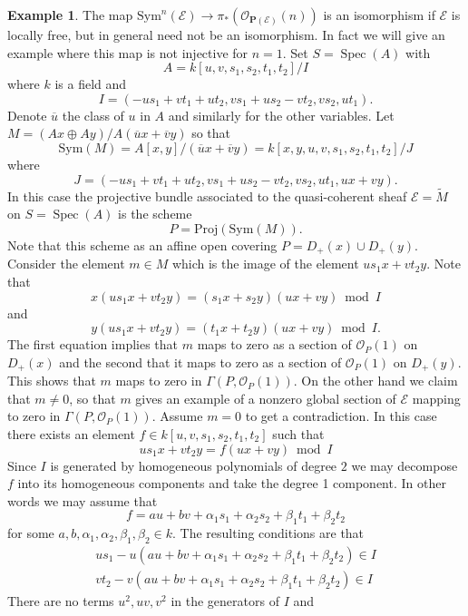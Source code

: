 \documentclass{stacks-project}
\theoremstyle{plain}
\theoremstyle{definition}
\newtheorem{example}[subsection]{Example}
\theoremstyle{remark}
\numberwithin{equation}{subsection}
\def\Spec{\mathop{\mathrm{Spec}}}
\begin{document}
\begin{example}
\label{example-projective-bundle}
The map $\text{Sym}^n(\mathcal{E}) \to
\pi_*(\mathcal{O}_{\mathbf{P}(\mathcal{E})}(n))$
is an isomorphism if $\mathcal{E}$ is locally free, but in general
need not be an isomorphism. In fact we will give an example where
this map is not injective for $n = 1$. Set $S = \Spec(A)$ with
$$
A = k[u, v, s_1, s_2, t_1, t_2]/I
$$
where $k$ is a field and
$$
I = (-us_1 + vt_1 + ut_2, vs_1 + us_2 - vt_2, vs_2, ut_1).
$$
Denote $\overline{u}$ the class of $u$ in $A$ and similarly for
the other variables.
Let $M = (Ax \oplus Ay)/A(\overline{u}x + \overline{v}y)$ so that
$$
\text{Sym}(M) = A[x, y]/(\overline{u}x + \overline{v}y)
= k[x, y, u, v, s_1, s_2, t_1, t_2]/J
$$
where
$$
J = (-us_1 + vt_1 + ut_2, vs_1 + us_2 - vt_2, vs_2, ut_1, ux + vy).
$$
In this case the projective bundle associated to the quasi-coherent
sheaf $\mathcal{E} = \widetilde{M}$ on $S = \Spec(A)$ is the scheme
$$
P =
\text{Proj}(\text{Sym}(M)).
$$
Note that this scheme as an affine open covering
$P = D_{+}(x) \cup D_{+}(y)$.
Consider the element
$m \in M$ which is the image of the element
$us_1x + vt_2y$. Note that
$$
x(us_1x + vt_2y) = (s_1x + s_2y)(ux + vy) \bmod I
$$
and
$$
y(us_1x + vt_2y) = (t_1x + t_2y)(ux + vy) \bmod I.
$$
The first equation implies that $m$ maps to zero as a
section of $\mathcal{O}_P(1)$ on $D_{+}(x)$ and the second
that it maps to zero as a section of $\mathcal{O}_P(1)$ on $D_{+}(y)$.
This shows that $m$ maps to zero in $\Gamma(P, \mathcal{O}_P(1))$.
On the other hand we claim that $m \not = 0$, so that $m$ gives
an example of a nonzero global section of $\mathcal{E}$ mapping to zero
in $\Gamma(P, \mathcal{O}_P(1))$. Assume $m = 0$
to get a contradiction. In this case there exists
an element $f \in k[u, v, s_1, s_2, t_1, t_2]$ such that
$$
us_1x + vt_2y = f(ux + vy) \bmod I
$$
Since $I$ is generated by homogeneous polynomials of degree $2$ we
may decompose $f$ into its homogeneous components and take the
degree 1 component. In other words we may assume that
$$
f = au + bv + \alpha_1s_1 + \alpha_2s_2 + \beta_1t_1 + \beta_2t_2
$$
for some $a, b, \alpha_1, \alpha_2, \beta_1, \beta_2 \in k$.
The resulting conditions are that
$$
\begin{matrix}
us_1 - u(au + bv + \alpha_1s_1 + \alpha_2s_2 + \beta_1t_1 + \beta_2t_2)
\in I \\
vt_2 - v(au + bv + \alpha_1s_1 + \alpha_2s_2 + \beta_1t_1 + \beta_2t_2)
\in I
\end{matrix}
$$
There are no terms $u^2, uv, v^2$ in the generators of $I$ and

\end{example}
\end{document}
